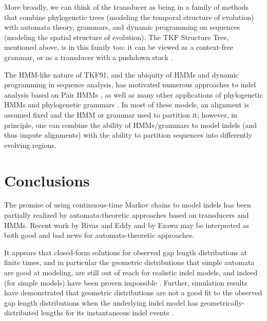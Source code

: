 \documentclass{bmcart}
\begin{document}
More broadly, we can think of the transducer as being in a family of methods
that combine phylogenetic trees (modeling the temporal structure of evolution)
with automata theory, grammars, and dynamic programming on sequences (modeling the spatial structure of evolution).
The TKF Structure Tree, mentioned above, is in this family too:
it can be viewed as a context-free grammar, or as a transducer with a pushdown stack \cite{Holmes2004}.

The HMM-like nature of TKF91, and the ubiquity of HMMs and dynamic programming in sequence analysis,
has motivated numerous approaches to indel analysis based on Pair HMMs
\cite{ThorneEtal92,KnudsenMiyamoto2003,WangKeightleyJohnson2006,RivasEddy2008,RivasEddy2015},
as well as many other applications of 
phylogenetic HMMs \cite{FelsensteinChurchill96,GoldmanEtAl96,PedersenHein2003,SiepelHaussler04,SiepelHaussler04b}
and phylogenetic grammars \cite{KnudsenHein99,KnudsenHein2003,PedersenEtAl04,PedersenEtAl2006,KlostermanEtAl2006,pmid22693624}.
In most of these models, an alignment is assumed fixed and the HMM or grammar used to partition it;
however, in principle, one can combine the ability of HMMs/grammars to model indels (and thus impute alignments)
with the ability to partition sequences into differently evolving regions.

\section*{Conclusions}

The promise of using continuous-time Markov chains to model indels
has been partially realized by automata-theoretic approaches
based on transducers and HMMs.
Recent work by Rivas and Eddy \cite{RivasEddy2015}
and by Ezawa \cite{Ezawa2016a,Ezawa2016b,Ezawa2016bErratum}
may be interpreted as both good and bad news for automata-theoretic approaches.

It appears that closed-form solutions for observed gap length distributions at finite times,
and in particular the geometric distributions that simple automata are good at modeling,
are still out of reach for realistic indel models,
and indeed (for simple models) have been proven impossible \cite{RivasEddy2015}.
Further, simulation results have demonstrated that geometric distributions are not
a good fit to the observed gap length distributions when the underlying indel model
has geometrically-distributed lengths for its instantaneous indel events \cite{RivasEddy2015,Ezawa2016a}.
\end{document}
